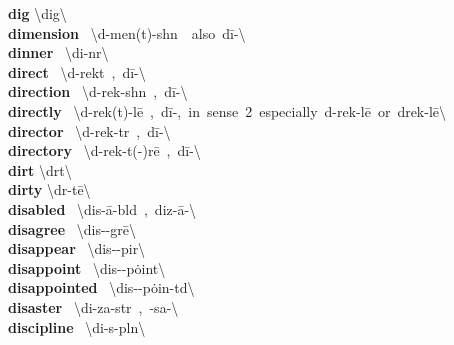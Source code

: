 \documentclass[10pt,a4paper]{article}
\begin{document}
\begin{multicols}{2}
\textbf{ dig }\quad \textbackslash \textprimstress dig\textbackslash \\
\textbf{ dimension }\quad \ \textbackslash d\textschwa -\textprimstress men(t)-sh\textschwa n\ \ also\ d\={i}-\textbackslash \\
\textbf{ dinner }\quad \ \textbackslash \textprimstress di-n\textschwa r\textbackslash \\
\textbf{ direct }\quad \ \textbackslash d\textschwa -\textprimstress rekt\ ,\ d\={i}-\textbackslash \\
\textbf{ direction }\quad \ \textbackslash d\textschwa -\textprimstress rek-sh\textschwa n\ ,\ d\={i}-\textbackslash \\
\textbf{ directly }\quad \ \textbackslash d\textschwa -\textprimstress rek(t)-l\={e}\ ,\ d\={i}-,\ in\ sense\ 2\ especially\ d\textschwa -\textprimstress rek-l\={e}\ or\ \textprimstress drek-l\={e}\textbackslash \\
\textbf{ director }\quad \ \textbackslash d\textschwa -\textprimstress rek-t\textschwa r\ ,\ d\={i}-\textbackslash \\
\textbf{ directory }\quad \ \textbackslash d\textschwa -\textprimstress rek-t(\textschwa -)r\={e}\ ,\ d\={i}-\textbackslash \\
\textbf{ dirt }\quad \textbackslash \textprimstress d\textschwa rt\textbackslash \\
\textbf{ dirty }\quad \textbackslash \textprimstress d\textschwa r-t\={e}\textbackslash \\
\textbf{ disabled }\quad \ \textbackslash dis-\textprimstress \={a}-b\textschwa ld\ ,\ diz-\textprimstress \={a}-\textbackslash \\
\textbf{ disagree }\quad \ \textbackslash \textsecstress dis-\textschwa -\textprimstress gr\={e}\textbackslash \\
\textbf{ disappear }\quad \ \textbackslash \textsecstress dis-\textschwa -\textprimstress pir\textbackslash \\
\textbf{ disappoint }\quad \ \textbackslash \textsecstress dis-\textschwa -\textprimstress p\.{o}int\textbackslash \\
\textbf{ disappointed }\quad \ \textbackslash \textsecstress dis-\textschwa -\textprimstress p\.{o}in-t\textschwa d\textbackslash \\
\textbf{ disaster }\quad \ \textbackslash di-\textprimstress za-st\textschwa r\ ,\ -\textprimstress sa-\textbackslash \\
\textbf{ discipline }\quad \ \textbackslash \textprimstress di-s\textschwa -pl\textschwa n\textbackslash \\

\end{multicols}
\end{document}
